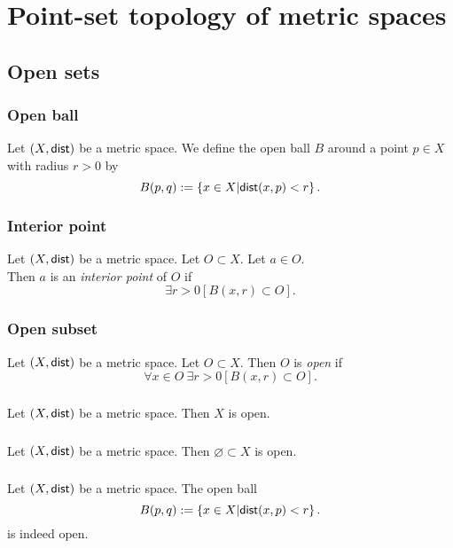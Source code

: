 \section{Point-set topology of metric spaces}

\subsection{Open sets}
\subsubsection*{Open ball}
\udef Let $(X, \mathsf{dist})$ be a metric space. We define the open ball $B$ around
a point $p \in X$ with radius $r > 0$ by
\[
    B(p,q) := \left\{ x \in X \middle| \mathsf{dist}(x,p) < r \right\}.
\]

\subsubsection*{Interior point}
Let $(X, \mathsf{dist})$ be a metric space.
Let $O \subset X$. Let $a \in O$.\\
Then $a$ is an \emph{interior point} of $O$ if
\[
    \exists r > 0 \left[ B(x,r) \subset O \right].
\]

\subsubsection*{Open subset}
\udef Let $(X, \mathsf{dist})$ be a metric space.
Let $O \subset X$. Then $O$ is \emph{open} if
\[
    \forall x \in O\ \exists r > 0 \left[ B(x,r) \subset O \right].
\]

\subsubsection*{}
\uprop Let $(X, \mathsf{dist})$ be a metric space. Then $X$ is open.

\subsubsection*{}
\uprop Let $(X, \mathsf{dist})$ be a metric space. Then $\varnothing \subset X$ is open.

\subsubsection*{}
\uprop Let $(X, \mathsf{dist})$ be a metric space. The open ball
\[
    B(p,q) := \left\{ x \in X \middle| \mathsf{dist}(x,p) < r \right\}.
\]
is indeed open.

